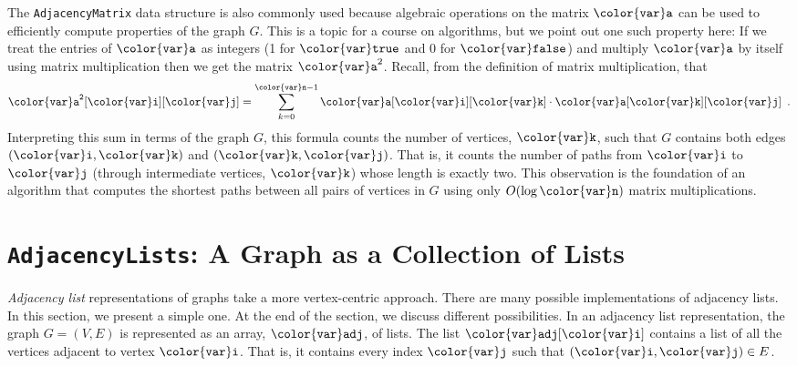 \documentclass[10pt]{book}
\newcommand{\seclabel}[1]{\label{sec:#1}}
\theoremstyle{plain}
\theoremstyle{definition}
\begin{document}
The \texttt{AdjacencyMatrix} data structure is also commonly used because
algebraic operations on the matrix \ensuremath{\mathtt{{\color{var}a}}} can be used to efficiently compute
properties of the graph $G$.  This is a topic for a course on algorithms,
but we point out one such property here:  If we treat the entries of \ensuremath{\mathtt{{\color{var}a}}}
as integers (1 for \ensuremath{\mathtt{{\color{var}true}}} and 0 for \ensuremath{\mathtt{{\color{var}false}}}) and multiply \ensuremath{\mathtt{{\color{var}a}}} by itself
using matrix multiplication then we get the matrix $\ensuremath{\mathtt{{\color{var}a}}}^2$.  Recall,
from the definition of matrix multiplication, that
\[
    \ensuremath{\mathtt{{\color{var}a}^2[{\color{var}i}][{\color{var}j}]}} = \sum_{k=0}^{\ensuremath{\mathtt{{\color{var}n}}}-1} \ensuremath{\mathtt{{\color{var}a}[{\color{var}i}][{\color{var}k}]}}\cdot \ensuremath{\mathtt{{\color{var}a}[{\color{var}k}][{\color{var}j}]}} \enspace .
\]
Interpreting this sum in terms of the graph $G$, this formula counts the
number of vertices, $\ensuremath{\mathtt{{\color{var}k}}}$, such that $G$ contains both edges \ensuremath{\mathtt{({\color{var}i},{\color{var}k})}}
and \ensuremath{\mathtt{({\color{var}k},{\color{var}j})}}.  That is, it counts the number of paths from $\ensuremath{\mathtt{{\color{var}i}}}$ to $\ensuremath{\mathtt{{\color{var}j}}}$
(through intermediate vertices, $\ensuremath{\mathtt{{\color{var}k}}}$) whose length is exactly two.
This observation is the foundation of an algorithm that computes the
shortest paths between all pairs of vertices in $G$ using only $O(\log
\ensuremath{\mathtt{{\color{var}n}}})$ matrix multiplications.

\section{\texttt{AdjacencyLists}: A Graph as a Collection of Lists}
\seclabel{adjacency-list}

%
\emph{Adjacency list} representations of graphs take a more vertex-centric
approach.  There are many possible implementations of adjacency lists.
In this section, we present a simple one.  At the end of the section,
we discuss different possibilities.  In an adjacency list representation,
the graph $G=(V,E)$ is represented as an array, \ensuremath{\mathtt{{\color{var}adj}}}, of lists.  The list
\ensuremath{\mathtt{{\color{var}adj}[{\color{var}i}]}} contains a list of all the vertices adjacent to vertex \ensuremath{\mathtt{{\color{var}i}}}.
That is, it contains every index \ensuremath{\mathtt{{\color{var}j}}} such that $\ensuremath{\mathtt{({\color{var}i},{\color{var}j})}}\in E$.
\end{document}
